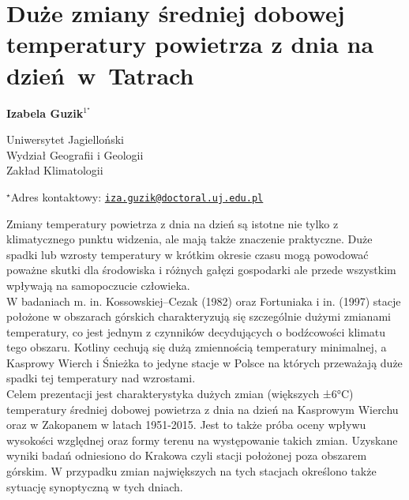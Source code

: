 \documentclass[\main/boa.tex]{subfiles}
\begin{document}
\section{Duże zmiany średniej dobowej  temperatury powietrza z dnia na dzień~w~{Tatrach}}

\begin{center}
  {\bf {} Izabela Guzik$^{1^\star}$}
\end{center}

\vskip 0.3cm

\begin{affiliations}
\begin{enumerate}
\begin{minipage}{0.915\textwidth}
\centering
\item Uniwersytet Jagielloński \\Wydział Geografii i Geologii\\ Zakład Klimatologii \\[-2pt]
\end{minipage}
\end{enumerate}
$^\star$Adres kontaktowy: \href{mailto:iza.guzik@doctoral.uj.edu.pl}{\nolinkurl{iza.guzik@doctoral.uj.edu.pl}}\\
\end{affiliations}

\vskip 0.5cm


\vskip 0.5cm

Zmiany temperatury powietrza z dnia na dzień są istotne nie tylko z klimatycznego punktu widzenia, ale mają także znaczenie praktyczne. Duże spadki lub wzrosty temperatury w krótkim okresie czasu mogą powodować poważne skutki dla środowiska i różnych gałęzi gospodarki ale przede wszystkim wpływają na samopoczucie człowieka.\\
W badaniach m. in. Kossowskiej--Cezak (1982) oraz Fortuniaka i in. (1997) stacje położone w obszarach górskich charakteryzują się szczególnie dużymi zmianami temperatury, co jest jednym z czynników decydujących o bodźcowości klimatu tego obszaru. Kotliny cechują się dużą zmiennością temperatury minimalnej, a Kasprowy Wierch i Śnieżka to jedyne stacje w Polsce na których przeważają duże spadki tej temperatury nad wzrostami.\\
Celem prezentacji jest charakterystyka dużych zmian (większych ±6°C) temperatury średniej dobowej powietrza z dnia na dzień na Kasprowym Wierchu oraz w Zakopanem w latach 1951-2015. Jest to także próba oceny wpływu wysokości względnej oraz formy terenu na występowanie takich zmian. Uzyskane wyniki badań odniesiono do Krakowa czyli stacji położonej poza obszarem górskim. W przypadku zmian największych na tych stacjach określono także sytuację synoptyczną w tych dniach.
\end{document}
